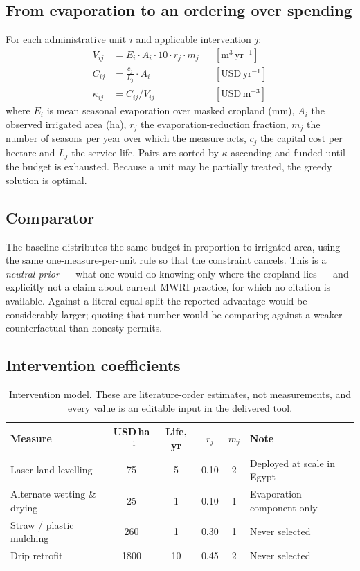 \documentclass[11pt,a4paper]{article}
\begin{document}
\subsection{From evaporation to an ordering over spending}

For each administrative unit $i$ and applicable intervention $j$:
\begin{align}
V_{ij} &= E_i \cdot A_i \cdot 10 \cdot r_j \cdot m_j
  && [\si{\cubic\metre}\,\text{yr}^{-1}] \\
C_{ij} &= \frac{c_j}{L_j} \cdot A_i
  && [\text{USD}\,\text{yr}^{-1}] \\
\kappa_{ij} &= C_{ij} / V_{ij}
  && [\text{USD}\,\text{m}^{-3}]
\end{align}
where $E_i$ is mean seasonal evaporation over masked cropland
(\si{\milli\metre}), $A_i$ the observed irrigated area (\si{\hectare}), $r_j$ the
evaporation-reduction fraction, $m_j$ the number of seasons per year over which
the measure acts, $c_j$ the capital cost per hectare and $L_j$ the service life.
Pairs are sorted by $\kappa$ ascending and funded until the budget is exhausted.
Because a unit may be partially treated, the greedy solution is optimal.

\subsection{Comparator}

The baseline distributes the same budget in proportion to irrigated area, using
the same one-measure-per-unit rule so that the constraint cancels. This is a
\emph{neutral prior} --- what one would do knowing only where the cropland lies
--- and explicitly not a claim about current MWRI practice, for which no citation
is available. Against a literal equal split the reported advantage would be
considerably larger; quoting that number would be comparing against a weaker
counterfactual than honesty permits.

\subsection{Intervention coefficients}

\begin{table}[h]\centering\small
\caption{Intervention model. These are literature-order estimates, not
measurements, and every value is an editable input in the delivered tool.}
\begin{tabular}{lS[table-format=4.0]S[table-format=2.0]S[table-format=1.2]S[table-format=1.0]l}
\toprule
Measure & {USD\,ha$^{-1}$} & {Life, yr} & {$r_j$} & {$m_j$} & Note \\
\midrule
Laser land levelling & 75 & 5 & 0.10 & 2 & Deployed at scale in Egypt \\
Alternate wetting \& drying & 25 & 1 & 0.10 & 1 & Evaporation component only \\
Straw / plastic mulching & 260 & 1 & 0.30 & 1 & Never selected \\
Drip retrofit & 1800 & 10 & 0.45 & 2 & Never selected \\
\bottomrule
\end{tabular}
\label{tab:interventions}
\end{table}
\end{document}
